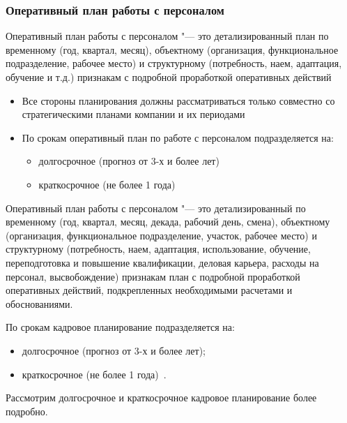 \documentclass{../industrial-development}
\begin{document}
\begin{frame} \frametitle{Оперативный план работы с персоналом}

\alert{Оперативный план работы с персоналом} "--- это детализированный план по временному (год, квартал, месяц), объектному (организация, функциональное подразделение, рабочее место) и структурному (потребность, наем, адаптация, обучение и т.д.) признакам с подробной проработкой оперативных действий

	  \begin{itemize}
		\item Все стороны планирования должны рассматриваться только совместно со стратегическими планами компании и их периодами
\item По срокам оперативный план по работе с персоналом подразделяется на:
  \begin{itemize}
	\item долгосрочное (прогноз от 3-х и более лет)
	\item краткосрочное (не более 1 года)
	  \end{itemize}
		  \end{itemize}

\end{frame}

\lecturenotes

\alert{Оперативный план работы с персоналом} "--- это детализированный по временному (год, квартал, месяц, декада, рабочий день, смена), объектному (организация, функциональное подразделение, участок, рабочее место) и структурному (потребность, наем, адаптация, использование, обучение, переподготовка и повышение квалификации, деловая карьера, расходы на персонал, высвобождение) признакам план с подробной проработкой оперативных действий, подкрепленных необходимыми расчетами и обоснованиями.

По срокам кадровое планирование подразделяется на:
 \begin{itemize}
\item	долгосрочное (прогноз от 3-х и более лет);
\item	краткосрочное (не более 1 года)~\cite[с.~86]{Ivanova}.
 \end{itemize}

Рассмотрим долгосрочное и краткосрочное кадровое планирование более подробно.


\end{document}
